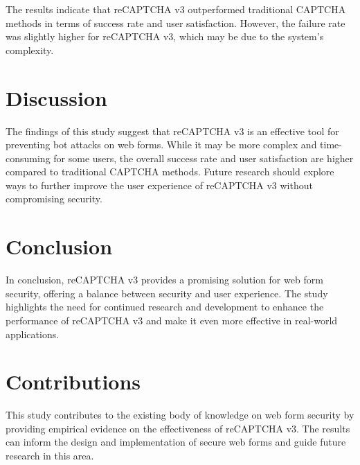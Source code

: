 \documentclass{article}
\begin{document}
The results indicate that reCAPTCHA v3 outperformed traditional CAPTCHA methods in terms of success rate and user satisfaction. However, the failure rate was slightly higher for reCAPTCHA v3, which may be due to the system's complexity.

\section{Discussion}
The findings of this study suggest that reCAPTCHA v3 is an effective tool for preventing bot attacks on web forms. While it may be more complex and time-consuming for some users, the overall success rate and user satisfaction are higher compared to traditional CAPTCHA methods. Future research should explore ways to further improve the user experience of reCAPTCHA v3 without compromising security.

\section{Conclusion}
In conclusion, reCAPTCHA v3 provides a promising solution for web form security, offering a balance between security and user experience. The study highlights the need for continued research and development to enhance the performance of reCAPTCHA v3 and make it even more effective in real-world applications.

\section{Contributions}
This study contributes to the existing body of knowledge on web form security by providing empirical evidence on the effectiveness of reCAPTCHA v3. The results can inform the design and implementation of secure web forms and guide future research in this area.



\end{document}
